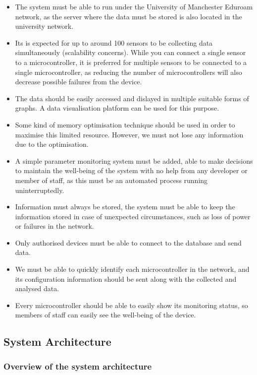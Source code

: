 \documentclass[12pt]{article}
\begin{document}
\begin{itemize}
    \item The system must be able to run under the University of Manchester Eduroam network, as the server where the data must be stored is also located in the university network.
    \item Its is expected for up to around 100 sensors to be collecting data simultaneously (scalability concerns). While you can connect a single sensor to a microcontroller, it is preferred for multiple sensors to be connected to a single microcontroller, as reducing the number of microcontrollers will also decrease possible failures from the device.
    \item The data should be easily accessed and dislayed in multiple suitable forms of graphs. A data visualisation platform can be used for this purpose. 
    \item Some kind of memory optimisation technique should be used in order to maximise this limited resource. However, we must not lose any information due to the optimisation.
    \item A simple parameter monitoring system must be added, able to make decisions to maintain the well-being of the system with no help from any developer or member of staff, as this must be an automated process running uninterruptedly.
    \item Information must always be stored, the system must be able to keep the information stored in case of unexpected circumstances, such as loss of power or failures in the network.
    \item Only authorised devices must be able to connect to the database and send data.
    \item We must be able to quickly identify each microcontroller in the network, and its configuration information should be sent along with the collected and analysed data.  
    \item Every microcontroller should be able to easily show its monitoring status, so members of staff can easily see the well-being of the device. 
\end{itemize}

\subsection{System Architecture}

\subsubsection{Overview of the system architecture}
\end{document}
